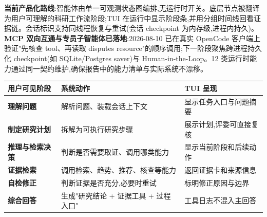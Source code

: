 \begin{plainbox}
\textbf{当前产品化路线}:智能体由单一可观测状态图编排,无运行时开关。底层节点被翻译为用户可理解的科研工作流阶段;TUI 在运行中显示阶段条,并用分组时间线回看证据链。会话标识支持同线程恢复与重试(会话 checkpoint 为内存级,进程内持久)。\textbf{MCP 双向互通与专员子智能体已落地}:2026-08-10 已在真实 OpenCode 客户端上验证"先核查 tool、再读取 disputes resource"的顺序调用;下一阶段聚焦跨进程持久化 checkpoint(如 SQLite/Postgres saver)与 Human-in-the-Loop。12 类运行时能力通过同一契约维护,确保报告中的能力清单与实际系统不漂移。
\end{plainbox}

\begin{tableblock}
\begin{tabularx}{0.96\textwidth}{>{\bfseries}p{30mm}XX}
\toprule
用户可见阶段 & 系统动作 & TUI 呈现 \\
\midrule
理解问题 & 解析问题、装载会话上下文 & 显示任务入口与问题摘要 \\
制定研究计划 & 拆解为可执行研究步骤 & 展示计划,评委可直接复核 \\
推理与检索决策 & 判断是否需要取证、调用哪类能力 & 显示当前阶段和后续动作 \\
证据检索 & 调用检索、趋势、推荐、核查等能力 & 返回证据卡和来源信息 \\
自检修正 & 判断证据是否充分,必要时重试 & 标明修正原因与边界 \\
综合回答 & 生成"研究结论 + 证据工具 + 过程入口" & 工具日志不混入主回答 \\
\bottomrule
\end{tabularx}
\end{tableblock}

